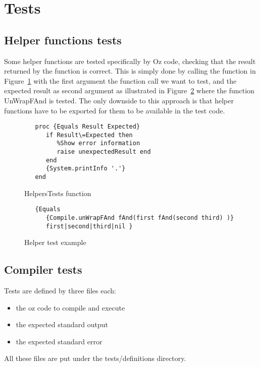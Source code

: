 \documentclass[a4paper]{memoir}
\begin{document}
\section{Tests}
\subsection{Helper functions tests}
Some helper functions are tested specifically by Oz code, checking that the result returned by the function is correct. This is simply done by calling the function in Figure~\ref{fig:helperstestsfunction} with the first argument the function call we want to test, and the expected result as second argument as illustrated in Figure~\ref{fig:helperstestsexample} where the function UnWrapFAnd is tested.
The only downside to this approach is that helper functions have to be exported for them to be available in the test code.

\begin{figure}
\begin{lstlisting}
   proc {Equals Result Expected}
      if Result\=Expected then
         %Show error information
         raise unexpectedResult end
      end
      {System.printInfo '.'}
   end
\end{lstlisting}
\caption{HelpersTests function}
\label{fig:helperstestsfunction}
\end{figure}

\begin{figure}
\begin{lstlisting}
   {Equals 
      {Compile.unWrapFAnd fAnd(first fAnd(second third) )}
      first|second|third|nil }
\end{lstlisting}
\caption{Helper test example}
\label{fig:helperstestsexample}
\end{figure}
\subsection{Compiler tests}
Tests are defined by three files each:
\begin{itemize}
  \item the oz code to compile and execute
  \item the expected standard output
  \item the expected standard error
\end{itemize}
All these files are put under the tests/definitions directory.
\end{document}
